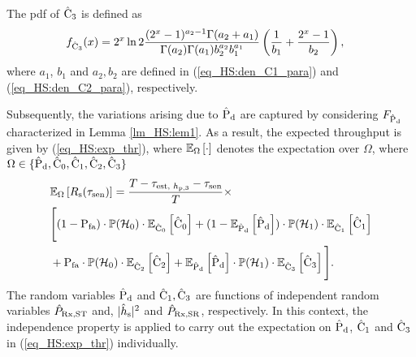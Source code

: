 \begin{lemma} \label{lm_HS:lem6}
\normalfont
The pdf of $\ecth$ is defined as 
\begin{align}
\dcth(x) &= 2^x \ln 2 \frac{(2^x - 1)^{a_2 - 1} \Gamma(a_2 + a_1)}{\Gamma(a_2) \Gamma(a_1) b_2^{a_2} b_1^{a_1}} \left(\frac{1}{b_1} + \frac{2^x - 1}{b_2}\right), \label{eq_HS:den_C3}
\end{align}
where $a_1$, $b_1$ and $a_2, b_2$ are defined in (\ref{eq_HS:den_C1_para}) and (\ref{eq_HS:den_C2_para}), respectively.
\end{lemma}
Subsequently, the variations arising due to $\epd$ are captured by considering $\fpd$ characterized in Lemma \ref{lm_HS:lem1}. As a result, the expected throughput is given by (\ref{eq_HS:exp_thr}), where $\e{\Omega}{\cdot}$ denotes the expectation over $\Omega$, where $\Omega \in \{ \epd, \ecz, \eco, \ectw, \ecth \}$ 
\begin{align}
&\e{\Omega}{\rs(\tsen)} = \frac{T - \testpr - \tsen}{T} \times \nonumber \\ 
&\Bigg[ (1 - \pfa) \cdot \phz \cdot \e{\ecz}{\ecz} +  (1 - \e{\epd}\epd) \cdot \pho \cdot \e{\eco}{\eco} \nonumber \\ &+  \pfa \cdot \phz \cdot \e{\ectw}{\ectw} +  \e{\epd}{\epd} \cdot \pho \cdot \e{\ecth}{\ecth} \Bigg]. \label{eq_HS:exp_thr} 
\end{align}
The random variables $\epd$ and  $\eco, \ecth$ are functions of independent random variables $\eprcvd$ and, $\ephs$ and $\eprcvdsr$, respectively. In this context, the independence property is applied to carry out the expectation on $\epd$, $\eco$ and $\ecth$ in (\ref{eq_HS:exp_thr}) individually.


